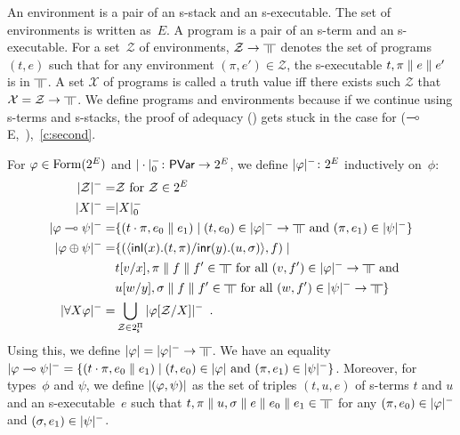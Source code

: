 An environment is a pair of an s-stack and an s-executable.
The set of environments is written as~$E$.
A program is a pair of an s-term and an s-executable.
For a set~$\mathcal Z$ of environments, $\mathcal Z\rightarrow\bbot$ denotes
the set of programs $(t,e)$ such that
for any environment $(\pi,e')\in \mathcal Z$,
the s-executable $t,\pi\parallel e \parallel e'$ is in $\bbot$.
A set $\mathcal X$ of programs is called a truth value
iff there exists
such $\mathcal Z$ that $\mathcal X = \mathcal Z\rightarrow \bbot$.
We define programs and environments because if we continue using
s-terms and s-stacks, the proof of adequacy () gets
stuck in the case for
($\multimap$E,~\textminus),~\ref{c:second}.

For $\varphi\in\mathop{\text{Form}}(2^E)$ and $|\cdot|^-_0\colon\mathsf{PVar}\rightarrow 2^E$,
we define $|{\varphi}|^-\colon
2^E$ inductively on~$\phi$:
\begin{align*}
 \nsem{\mathcal Z} =& \mathcal Z \text{ for } \mathcal Z\in 2^E\\
 \nsem{X}=& |X|_0^- \\
 \nsem{\phi\limp\psi}=&
 \{(t\cdot\pi, e_0\conc e_1)\mid
 (t,e_0)\in\nsem\phi\rightarrow\bbot \text{ and }(\pi,e_1)\in\nsem\psi\}\\
 \nsem{\phi\oplus\psi}=& \{(\mats x{t}{\pi}y{u}{\sigma}, f)\mid\\ &
 t[v/x],\pi\conc f\conc f'\in\bbot \text{ for all } (v,f')\in\nsem{\phi}\rightarrow\bbot\text{
 and }\\ &
 u[w/y],\sigma\conc f\conc f'\in\bbot \text{ for all } (w,f')\in\nsem{\psi}\rightarrow\bbot\}
 \\
 \nsem{\forall X\phi}=&
 \bigcup_{\mathcal Z\in 2^\sPi} \nsem{\phi[\mathcal Z/X]}\enspace.
\end{align*}
Using this, we define $\sem \phi=\nsem{\phi}\rightarrow\bbot$.
We have an equality
$|{\varphi\multimap\psi}|^- = \{(t\cdot\pi, e_0\parallel e_1)\mid
(t,e_0)\in|{\varphi}|\text{ and }(\pi,e_1)\in|{\psi}|^-\}$.
Moreover, for types~$\phi$ and $\psi$, we define $|{(\varphi,\psi)}|$
as the set of triples $(t,u,e)$ of s-terms $t$ and $u$ and an s-executable~$e$
such
that
$t,\pi\conc u,\sigma\conc e\conc e_0\conc e_1
\in\bbot$ for any $(\pi,e_0)\in|{\varphi}|^-$
and $(\sigma,e_1)\in|{\psi}|^-$.

